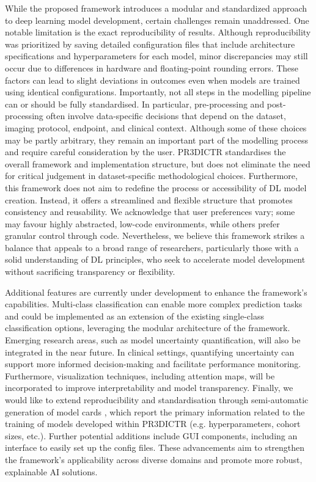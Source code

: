 \documentclass[11pt]{article}
\begin{document}
While the proposed framework introduces a modular and standardized approach to deep learning model development, certain challenges remain unaddressed. One notable limitation is the exact reproducibility of results. Although reproducibility was prioritized by saving detailed configuration files that include architecture specifications and hyperparameters for each model, minor discrepancies may still occur due to differences in hardware and floating-point rounding errors. These factors can lead to slight deviations in outcomes even when models are trained using identical configurations. Importantly, not all steps in the modelling pipeline can or should be fully standardised. In particular, pre-processing and post-processing often involve data-specific decisions that depend on the dataset, imaging protocol, endpoint, and clinical context. Although some of these choices may be partly arbitrary, they remain an important part of the modelling process and require careful consideration by the user. PR3DICTR standardises the overall framework and implementation structure, but does not eliminate the need for critical judgement in dataset-specific methodological choices. Furthermore, this framework does not aim to redefine the process or accessibility of DL model creation. Instead, it offers a streamlined and flexible structure that promotes consistency and reusability. We acknowledge that user preferences vary; some may favour highly abstracted, low-code environments, while others prefer granular control through code. Nevertheless, we believe this framework strikes a balance that appeals to a broad range of researchers, particularly those with a solid understanding of DL principles, who seek to accelerate model development without sacrificing transparency or flexibility.

Additional features are currently under development to enhance the framework's capabilities. Multi-class classification can enable more complex prediction tasks and could be implemented as an extension of the existing single-class classification options, leveraging the modular architecture of the framework. Emerging research areas, such as model uncertainty quantification, will also be integrated in the near future. In clinical settings, quantifying uncertainty can support more informed decision-making and facilitate performance monitoring. Furthermore, visualization techniques, including attention maps, will be incorporated to improve interpretability and model transparency. Finally, we would like to extend reproducibility and standardisation through semi-automatic generation of model cards \cite{Barragn-Montero2025}, which report the primary information related to the training of models developed within PR3DICTR (e.g. hyperparameters, cohort sizes, etc.). Further potential additions include GUI components, including an interface to easily set up the config files. These advancements aim to strengthen the framework's applicability across diverse domains and promote more robust, explainable AI solutions.
\end{document}
